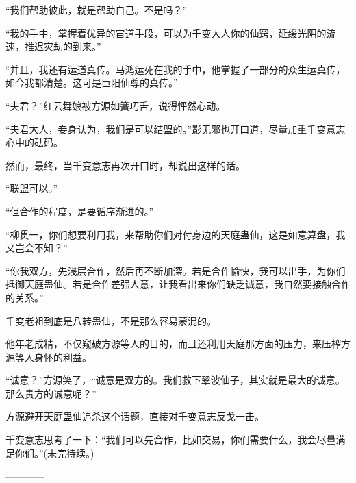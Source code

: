 \begin{this_body}
“我们帮助彼此，就是帮助自己。不是吗？”

“我的手中，掌握着优异的宙道手段，可以为千变大人你的仙窍，延缓光阴的流速，推迟灾劫的到来。”

“并且，我还有运道真传。马鸿运死在我的手中，他掌握了一部分的众生运真传，如今我都清楚。这可是巨阳仙尊的真传。”

“夫君？”红云舞娘被方源如簧巧舌，说得怦然心动。

“夫君大人，妾身认为，我们是可以结盟的。”影无邪也开口道，尽量加重千变意志心中的砝码。

然而，最终，当千变意志再次开口时，却说出这样的话。

“联盟可以。”

“但合作的程度，是要循序渐进的。”

“柳贯一，你们想要利用我，来帮助你们对付身边的天庭蛊仙，这是如意算盘，我又岂会不知？”

“你我双方，先浅层合作，然后再不断加深。若是合作愉快，我可以出手，为你们抵御天庭蛊仙。若是合作差强人意，让我看出来你们缺乏诚意，我自然要接触合作的关系。”

千变老祖到底是八转蛊仙，不是那么容易蒙混的。

他年老成精，不仅窥破方源等人的目的，而且还利用天庭那方面的压力，来压榨方源等人身怀的利益。

“诚意？”方源笑了，“诚意是双方的。我们救下翠波仙子，其实就是最大的诚意。那么贵方的诚意呢？”

方源避开天庭蛊仙追杀这个话题，直接对千变意志反戈一击。

千变意志思考了一下：“我们可以先合作，比如交易，你们需要什么，我会尽量满足你们。”(未完待续。)

------------

\end{this_body}


